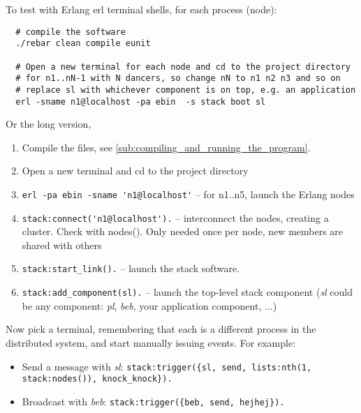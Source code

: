 \documentclass[a4paper]{article}
\begin{document}

To test with Erlang erl terminal shells, for each process (node):

\begin{verbatim}
  # compile the software
  ./rebar clean compile eunit

  # Open a new terminal for each node and cd to the project directory
  # for n1..nN-1 with N dancers, so change nN to n1 n2 n3 and so on
  # replace sl with whichever component is on top, e.g. an application
  erl -sname n1@localhost -pa ebin  -s stack boot sl
\end{verbatim}


Or the long version,

\begin{enumerate}

  \item Compile the files, see \ref{sub:compiling_and_running_the_program}.

  \item Open a new terminal and cd to the project directory

  \item \verb!erl -pa ebin -sname 'n1@localhost'! -- for n1..n5, launch the Erlang nodes

  \item \verb!stack:connect('n1@localhost').! -- interconnect the nodes, creating a cluster. Check with nodes(). Only needed once per node, new members are shared with others

  \item \verb!stack:start_link().! -- launch the stack software.

  \item \verb!stack:add_component(sl).! -- launch the top-level stack component (\emph{sl} could be any component: \emph{pl}, \emph{beb}, your application component, ...)

\end{enumerate}


Now pick a terminal, remembering that each is a different process in the
distributed system, and start manually issuing events. For example:

\begin{itemize}
  \item Send a message with \emph{sl}: \verb!stack:trigger({sl, send, lists:nth(1, stack:nodes()), knock_knock}).!
  \item Broadcast with \emph{beb}: \verb!stack:trigger({beb, send, hejhej}).!
\end{itemize}
\end{document}
